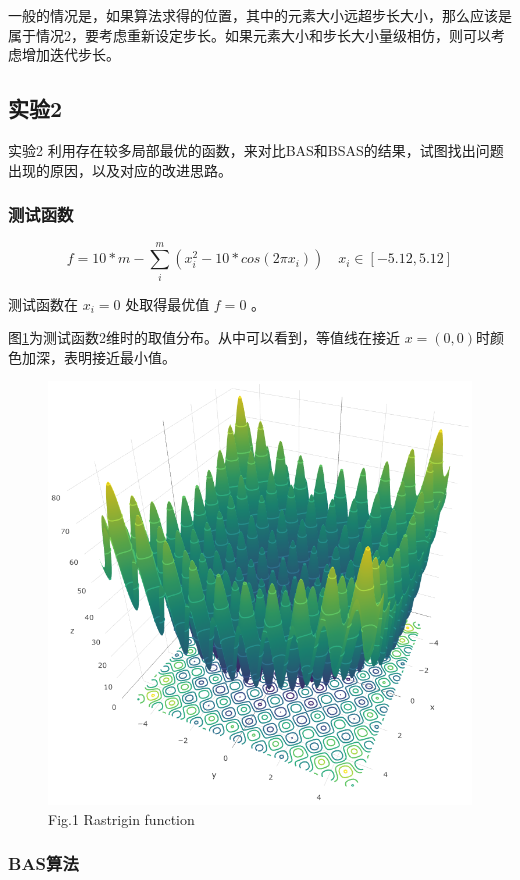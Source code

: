 \documentclass[]{ctexbook}
\begin{document}
一般的情况是，如果算法求得的位置，其中的元素大小远超步长大小，那么应该是属于情况2，要考虑重新设定步长。如果元素大小和步长大小量级相仿，则可以考虑增加迭代步长。

\subsection{实验2}\label{2}

实验2
利用存在较多局部最优的函数，来对比BAS和BSAS的结果，试图找出问题出现的原因，以及对应的改进思路。

\subsubsection{测试函数}\label{-1}

\begin{equation}
f=10*m - \sum_i^m (x_i^2-10*cos(2\pi x_i)) \quad x_i\in[-5.12,5.12]
\label{eq:RastPT}
\end{equation}

测试函数在 \(x_i = 0\) 处取得最优值 \(f = 0\) 。

图\ref{fig:Rast}为测试函数2维时的取值分布。从中可以看到，等值线在接近
\(x = (0,0)\)时颜色加深，表明接近最小值。

\begin{figure}

{\centering \includegraphics[width=0.6\linewidth,height=0.4\textheight]{img/Rast} 

}

\caption{Fig.1 Rastrigin function}\label{fig:Rast}
\end{figure}

\subsubsection{BAS算法}\label{bas-1}
\end{document}
